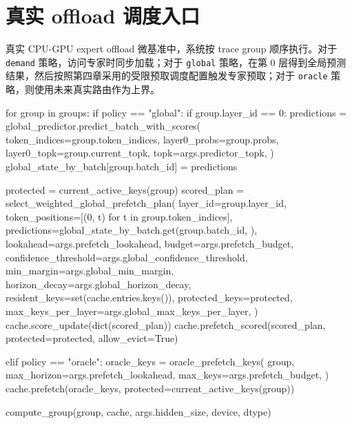 \section{真实 offload 调度入口}
真实 CPU-GPU expert offload 微基准中，系统按 trace group 顺序执行。对于 \texttt{demand} 策略，访问专家时同步加载；对于 \texttt{global} 策略，在第 0 层得到全局预测结果，然后按照第四章采用的受限预取调度配置触发专家预取；对于 \texttt{oracle} 策略，则使用未来真实路由作为上界。
\begin{CodeBlock}
for group in groups:
    if policy == "global":
        if group.layer_id == 0:
            predictions = global_predictor.predict_batch_with_scores(
                token_indices=group.token_indices,
                layer0_probs=group.probs,
                layer0_topk=group.current_topk,
                topk=args.predictor_topk,
            )
            global_state_by_batch[group.batch_id] = predictions

        protected = current_active_keys(group)
        scored_plan = select_weighted_global_prefetch_plan(
            layer_id=group.layer_id,
            token_positions=[(0, t) for t in group.token_indices],
            predictions=global_state_by_batch.get(group.batch_id, {}),
            lookahead=args.prefetch_lookahead,
            budget=args.prefetch_budget,
            confidence_threshold=args.global_confidence_threshold,
            min_margin=args.global_min_margin,
            horizon_decay=args.global_horizon_decay,
            resident_keys=set(cache.entries.keys()),
            protected_keys=protected,
            max_keys_per_layer=args.global_max_keys_per_layer,
        )
        cache.score_update(dict(scored_plan))
        cache.prefetch_scored(scored_plan, protected=protected, allow_evict=True)

    elif policy == "oracle":
        oracle_keys = oracle_prefetch_keys(
            group,
            max_horizon=args.prefetch_lookahead,
            max_keys=args.prefetch_budget,
        )
        cache.prefetch(oracle_keys, protected=current_active_keys(group))

    compute_group(group, cache, args.hidden_size, device, dtype)
\end{CodeBlock}

